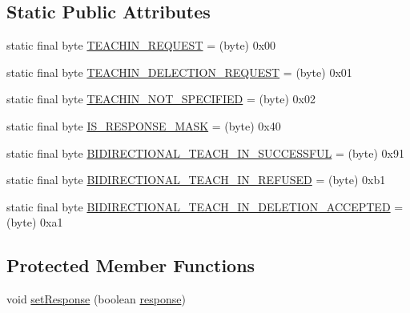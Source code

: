 \subsection*{Static Public Attributes}
\begin{DoxyCompactItemize}
\item 
static final byte \hyperlink{classit_1_1polito_1_1elite_1_1enocean_1_1enj_1_1eep_1_1eep26_1_1telegram_1_1_u_t_e_teach_in_telegram_ae59af28efc44bc9bb76ce6d584fe9012}{T\+E\+A\+C\+H\+I\+N\+\_\+\+R\+E\+Q\+U\+E\+ST} = (byte) 0x00
\item 
static final byte \hyperlink{classit_1_1polito_1_1elite_1_1enocean_1_1enj_1_1eep_1_1eep26_1_1telegram_1_1_u_t_e_teach_in_telegram_a96a13b6543d9a75560d4bc9b3e797a97}{T\+E\+A\+C\+H\+I\+N\+\_\+\+D\+E\+L\+E\+C\+T\+I\+O\+N\+\_\+\+R\+E\+Q\+U\+E\+ST} = (byte) 0x01
\item 
static final byte \hyperlink{classit_1_1polito_1_1elite_1_1enocean_1_1enj_1_1eep_1_1eep26_1_1telegram_1_1_u_t_e_teach_in_telegram_aeac8d4010a70b75cedb890fe5b2bb3f4}{T\+E\+A\+C\+H\+I\+N\+\_\+\+N\+O\+T\+\_\+\+S\+P\+E\+C\+I\+F\+I\+ED} = (byte) 0x02
\item 
static final byte \hyperlink{classit_1_1polito_1_1elite_1_1enocean_1_1enj_1_1eep_1_1eep26_1_1telegram_1_1_u_t_e_teach_in_telegram_a0f4e56b6121b2c66f1be07e7f629b774}{I\+S\+\_\+\+R\+E\+S\+P\+O\+N\+S\+E\+\_\+\+M\+A\+SK} = (byte) 0x40
\item 
static final byte \hyperlink{classit_1_1polito_1_1elite_1_1enocean_1_1enj_1_1eep_1_1eep26_1_1telegram_1_1_u_t_e_teach_in_telegram_afb26e3d383fce67e1885d0f03b07c428}{B\+I\+D\+I\+R\+E\+C\+T\+I\+O\+N\+A\+L\+\_\+\+T\+E\+A\+C\+H\+\_\+\+I\+N\+\_\+\+S\+U\+C\+C\+E\+S\+S\+F\+UL} = (byte) 0x91
\item 
static final byte \hyperlink{classit_1_1polito_1_1elite_1_1enocean_1_1enj_1_1eep_1_1eep26_1_1telegram_1_1_u_t_e_teach_in_telegram_a5522b77b16897faed6db03239bd4f21e}{B\+I\+D\+I\+R\+E\+C\+T\+I\+O\+N\+A\+L\+\_\+\+T\+E\+A\+C\+H\+\_\+\+I\+N\+\_\+\+R\+E\+F\+U\+S\+ED} = (byte) 0xb1
\item 
static final byte \hyperlink{classit_1_1polito_1_1elite_1_1enocean_1_1enj_1_1eep_1_1eep26_1_1telegram_1_1_u_t_e_teach_in_telegram_ace52e2944ae5427ae24129bc2e10cb39}{B\+I\+D\+I\+R\+E\+C\+T\+I\+O\+N\+A\+L\+\_\+\+T\+E\+A\+C\+H\+\_\+\+I\+N\+\_\+\+D\+E\+L\+E\+T\+I\+O\+N\+\_\+\+A\+C\+C\+E\+P\+T\+ED} = (byte) 0xa1
\end{DoxyCompactItemize}
\subsection*{Protected Member Functions}
\begin{DoxyCompactItemize}
\item 
void \hyperlink{classit_1_1polito_1_1elite_1_1enocean_1_1enj_1_1eep_1_1eep26_1_1telegram_1_1_u_t_e_teach_in_telegram_a012aabb551b128e915c003be7e7a9983}{set\+Response} (boolean \hyperlink{classit_1_1polito_1_1elite_1_1enocean_1_1enj_1_1eep_1_1eep26_1_1telegram_1_1_u_t_e_teach_in_telegram_a0cc5ba036863e135e7cfa2d94ab6facf}{response})
\end{DoxyCompactItemize}
